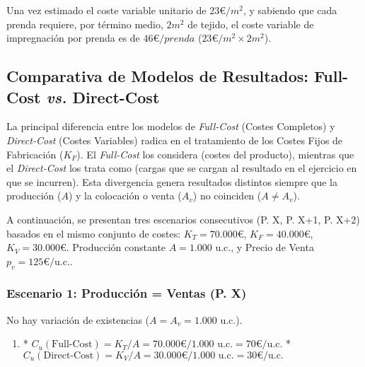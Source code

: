 \begin{anotacion}
Una vez estimado el coste variable unitario de $23 €/m^2$, y sabiendo que cada prenda requiere, por término medio, $2 m^2$ de tejido, el coste variable de impregnación por prenda es de $46 €/prenda$ ($23 €/m^2 \times 2 m^2$).
\end{anotacion}

\subsection{Comparativa de Modelos de Resultados: Full-Cost \textit{vs.} Direct-Cost}

La principal diferencia entre los modelos de \textit{Full-Cost} (Costes Completos) y \textit{Direct-Cost} (Costes Variables) radica en el tratamiento de los Costes Fijos de Fabricación ($K_F$). El \textit{Full-Cost} los considera  (costes del producto), mientras que el \textit{Direct-Cost} los trata como  (cargas que se cargan al resultado en el ejercicio en que se incurren). Esta divergencia genera resultados distintos siempre que la producción ($A$) y la colocación o venta ($A_v$) no coinciden ($A \neq A_v$).

A continuación, se presentan tres escenarios consecutivos (P. X, P. X+1, P. X+2) basados en el mismo conjunto de costes: $K_T = 70.000 €$, $K_F = 40.000 €$, $K_V = 30.000 €$. Producción constante $A=1.000$ u.c., y Precio de Venta $p_v = 125 €/$u.c..

\subsubsection{Escenario 1: Producción = Ventas (P. X)}

No hay variación de existencias ($A = A_v = 1.000$ u.c.).

\begin{enumerate}
    \item {}
    *   $C_u (\text{Full-Cost}) = K_T / A = 70.000 € / 1.000 \text{ u.c.} = 70 €/\text{u.c.}$
    *   $C_u (\text{Direct-Cost}) = K_V / A = 30.000 € / 1.000 \text{ u.c.} = 30 €/\text{u.c.}$
\end{enumerate}

